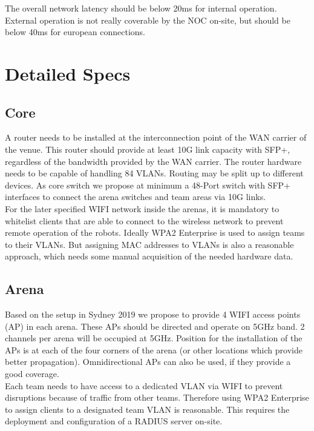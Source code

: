 The overall network latency should be below 20ms for internal operation. External operation is not really coverable by the NOC on-site, but should be below 40ms for european connections.


\section{Detailed Specs}

\subsection{Core}

A router needs to be installed at the interconnection point of the WAN carrier of the venue. This router should provide at least 10G link capacity with SFP+, regardless of the bandwidth provided by the WAN carrier. The router hardware needs to be capable of handling 84 VLANs. Routing may be split up to different devices.
As core switch we propose at minimum a 48-Port switch with SFP+ interfaces to connect the arena switches and team areas via 10G links.\\

For the later specified WIFI network inside the arenas, it is mandatory to whitelist clients that are able to connect to the wireless network to prevent remote operation of the robots. Ideally WPA2 Enterprise is used to assign teams to their VLANs. But assigning MAC addresses to VLANs is also a reasonable approach, which needs some manual acquisition of the needed hardware data.

\subsection{Arena}

Based on the setup in Sydney 2019 we propose to provide 4 WIFI access points (AP) in each arena. These APs should be directed and operate on 5GHz band. 2 channels per arena will be occupied at 5GHz. Position for the installation of the APs is at each of the four corners of the arena (or other locations which provide better propagation). Omnidirectional APs can also be used, if they provide a good coverage.\\

Each team needs to have access to a dedicated VLAN via WIFI to prevent disruptions because of traffic from other teams. Therefore using WPA2 Enterprise to assign clients to a designated team VLAN is reasonable. This requires the deployment and configuration of a RADIUS server on-site.\\


